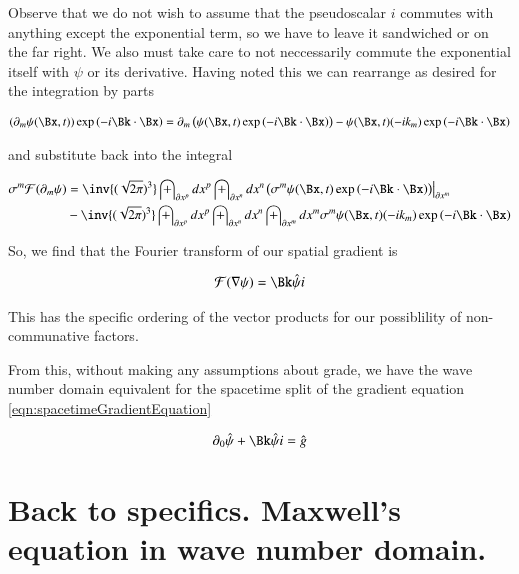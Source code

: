 \documentclass{article}
\newcommand{\FF}[0]{\mathcal{F}}
\begin{document}
Observe that we do not wish to assume that the pseudoscalar $i$ commutes with anything except the exponential term, so we have to leave
it sandwiched or on the far right.  We also must take care to not neccessarily commute the exponential itself with $\psi$ or its derivative.
Having noted this we can rearrange as desired for the integration by parts

\begin{align*}
(\partial_m \psi(\Bx, t)) \exp\left( -i \Bk \cdot \Bx \right)
&=
\partial_m \left( \psi(\Bx, t) \exp\left( -i \Bk \cdot \Bx \right) \right) - \psi(\Bx, t) ( -i k_m ) \exp\left( -i \Bk \cdot \Bx \right) \\
\end{align*}

and substitute back into the integral

\begin{align*}
\sigma^m \FF(\partial_m \psi) 
&= 
\inv{(\sqrt{2\pi})^3} 
\int_{\partial x^p} dx^p
\int_{\partial x^n} dx^n
{\left. {\left(\sigma^m \psi(\Bx, t) \exp\left( -i \Bk \cdot \Bx \right) \right)} \right\vert}_{\partial x^m} \\
&- 
\inv{(\sqrt{2\pi})^3} 
\int_{\partial x^p} dx^p
\int_{\partial x^n} dx^n
\int_{\partial x^m} dx^m
\sigma^m \psi(\Bx, t) ( -i k_m )
\exp\left( -i \Bk \cdot \Bx \right) 
\\
\end{align*}

So, we find that the Fourier transform of our spatial gradient is

\begin{align*}
\FF(\grad \psi) = \Bk \hat{\psi} i
\end{align*}

This has the specific ordering of the vector products for our possiblility of non-communative factors.

From this, without making any assumptions about grade, we have the wave number domain equivalent
for the spacetime split of the gradient equation \ref{eqn:spacetimeGradientEquation}

\begin{align}\label{eqn:waveDomainGeneral}
\partial_0 \hat{\psi} + \Bk \hat{\psi} i = \hat{g}
\end{align}

\section{ Back to specifics.  Maxwell's equation in wave number domain. }
\end{document}
